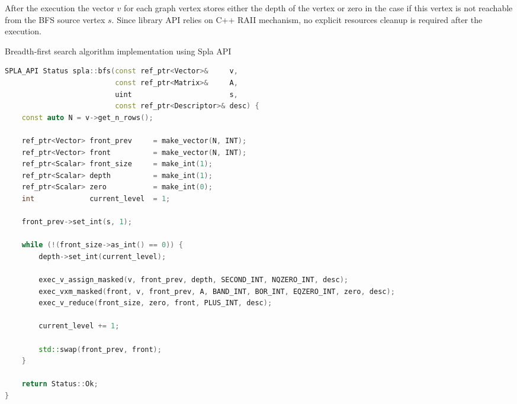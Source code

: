 After the execution the vector $v$ for each graph vertex stores either the depth of the vertex or zero in the case if this vertex is not reachable from the BFS source vertex $s$. Since library API relies on C++ RAII mechanism, no explicit resources cleanup is required after the execution.

\lstset{style=codelistingstyle}

\begin{algorithm}[]
\caption{Breadth-first search algorithm implementation using Spla API}
\label{alg:spla_bfs_example}
\begin{lstlisting}[language=C++]
SPLA_API Status spla::bfs(const ref_ptr<Vector>&     v,
                          const ref_ptr<Matrix>&     A,
                          uint                       s,
                          const ref_ptr<Descriptor>& desc) {
    const auto N = v->get_n_rows();

    ref_ptr<Vector> front_prev     = make_vector(N, INT);
    ref_ptr<Vector> front          = make_vector(N, INT);
    ref_ptr<Scalar> front_size     = make_int(1);
    ref_ptr<Scalar> depth          = make_int(1);
    ref_ptr<Scalar> zero           = make_int(0);
    int             current_level  = 1;
    
    front_prev->set_int(s, 1);

    while (!(front_size->as_int() == 0)) {
        depth->set_int(current_level);
        
        exec_v_assign_masked(v, front_prev, depth, SECOND_INT, NQZERO_INT, desc);
        exec_vxm_masked(front, v, front_prev, A, BAND_INT, BOR_INT, EQZERO_INT, zero, desc);
        exec_v_reduce(front_size, zero, front, PLUS_INT, desc);
        
        current_level += 1;

        std::swap(front_prev, front);
    }

    return Status::Ok;
}
\end{lstlisting}
\end{algorithm}